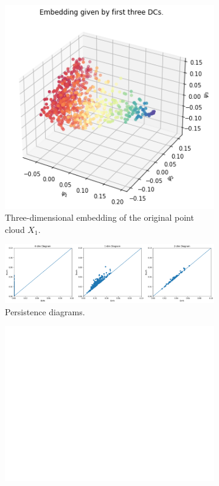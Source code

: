 \begin{figure}[H]
\centering
\begin{subfigure}[b]{0.2\textwidth}
    \includegraphics[width=\textwidth]{figures/X1_embedding.png}
    \caption{Three-dimensional embedding of the original point cloud $X_1$.}
\end{subfigure}
\hfill
\begin{subfigure}[b]{0.75\textwidth}
    \includegraphics[width=\textwidth]{figures/X1_H0.png}
    \caption{Persistence diagrams.}
\end{subfigure}
\begin{subfigure}[b]{0.25\textwidth}
\includegraphics[width=\textwidth]{figures/white.png} 

\end{subfigure}
\end{figure}

